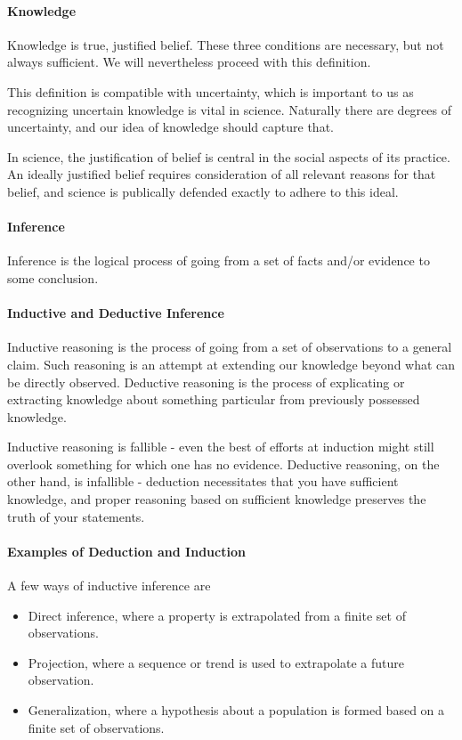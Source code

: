 \paragraph{Knowledge}
Knowledge is true, justified belief. These three conditions are necessary, but not always sufficient. We will nevertheless proceed with this definition.

This definition is compatible with uncertainty, which is important to us as recognizing uncertain knowledge is vital in science. Naturally there are degrees of uncertainty, and our idea of knowledge should capture that.

In science, the justification of belief is central in the social aspects of its practice. An ideally justified belief requires consideration of all relevant reasons for that belief, and science is publically defended exactly to adhere to this ideal.

\paragraph{Inference}
Inference is the logical process of going from a set of facts and/or evidence to some conclusion.

\paragraph{Inductive and Deductive Inference}
Inductive reasoning is the process of going from a set of observations to a general claim. Such reasoning is an attempt at extending our knowledge beyond what can be directly observed. Deductive reasoning is the process of explicating or extracting knowledge about something particular from previously possessed knowledge.

Inductive reasoning is fallible - even the best of efforts at induction might still overlook something for which one has no evidence. Deductive reasoning, on the other hand, is infallible - deduction necessitates that you have sufficient knowledge, and proper reasoning based on sufficient knowledge preserves the truth of your statements.

\paragraph{Examples of Deduction and Induction}
A few ways of inductive inference are
\begin{itemize}
	\item Direct inference, where a property is extrapolated from a finite set of observations.
	\item Projection, where a sequence or trend is used to extrapolate a future observation.
	\item Generalization, where a hypothesis about a population is formed based on a finite set of observations.
\end{itemize}

